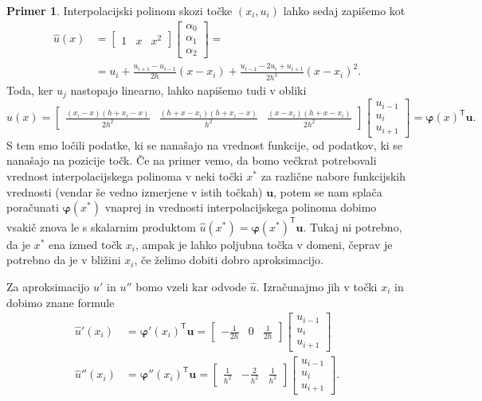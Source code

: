 \documentclass[12pt,a4paper,twoside]{article}
\theoremstyle{definition} %
\newtheorem{primer}[definicija]{Primer}
\theoremstyle{plain} %
\numberwithin{equation}{section}
\newcommand{\T}{\mathsf{T}}
\renewcommand{\b}{\boldsymbol}
\renewcommand{\phi}{\varphi}
\begin{document}
\begin{primer}
Interpolacijski polinom skozi točke $(x_i, u_i)$ lahko sedaj zapišemo kot
\begin{align*}
  \hat{u}(x) &=
  \begin{bmatrix}
    1 & x & x^2
  \end{bmatrix}
  \begin{bmatrix}
    \alpha_0 \\ \alpha_1 \\ \alpha_2
  \end{bmatrix} = \\
  &= u_i +\frac{u_{i+1}-u_{i-1}}{2 h}(x-x_i)+\frac{u_{i-1}-2 u_{i}+u_{i+1}}{2
  h^2}(x-x_i)^2.
\end{align*}
Toda, ker $u_j$ nastopajo linearno, lahko napišemo tudi v obliki
\[
  \hat{u}(x) =
  \begin{bmatrix}
  \frac{(x_i-x) (h+x_i-x)}{2 h^2} & \frac{(h+x-x_i)(h+x_i-x)}{h^2} & \frac{(x-x_i) (h+x-x_i)}{2 h^2}
  \end{bmatrix}
  \begin{bmatrix}
    u_{i-1} \\ u_{i} \\ u_{i+1}
  \end{bmatrix}= \b\phi(x)^\T\b u.
\]
S tem smo ločili podatke, ki se nanašajo na vrednost funkcije, od podatkov, ki se nanašajo na
pozicije točk. Če na primer vemo, da bomo večkrat potrebovali vrednost interpolacijskega polinoma v
neki točki $x^\ast$ za različne nabore funkcijskih vrednosti (vendar še vedno izmerjene v istih
točkah) $\b u$, potem se nam splača poračunati $\b\phi(x^\ast)$ vnaprej in vrednosti
interpolacijskega polinoma dobimo vsakič znova le s skalarnim produktom $\hat u(x^\ast) =
\b\phi(x^\ast) ^\T \b u$. Tukaj ni potrebno, da je $x^\ast$ ena izmed točk $x_i$, ampak je lahko
poljubna točka v domeni, čeprav je potrebno da je v bližini $x_i$, če želimo dobiti dobro
aproksimacijo.

Za aproksimacijo $u'$ in $u''$ bomo vzeli kar odvode $\hat{u}$. Izračunajmo
jih v točki $x_i$ in dobimo znane formule
\begin{align*}
  \hat u'(x_i) &= \b\phi'(x_i)^\T \b u =
  \begin{bmatrix}
    -\frac{1}{2h} & 0 & \frac{1}{2h}
  \end{bmatrix} \begin{bmatrix}
    u_{i-1} \\ u_{i} \\ u_{i+1}
  \end{bmatrix}\\
  \hat u''(x_i) &= \b\phi''(x_i)^\T \b u =
  \begin{bmatrix}
    \frac{1}{h^2} & -\frac{2}{h^2} & \frac{1}{h^2}
  \end{bmatrix}\begin{bmatrix}
    u_{i-1} \\ u_{i} \\ u_{i+1}
  \end{bmatrix}.
\end{align*}


\end{primer}
\end{document}
